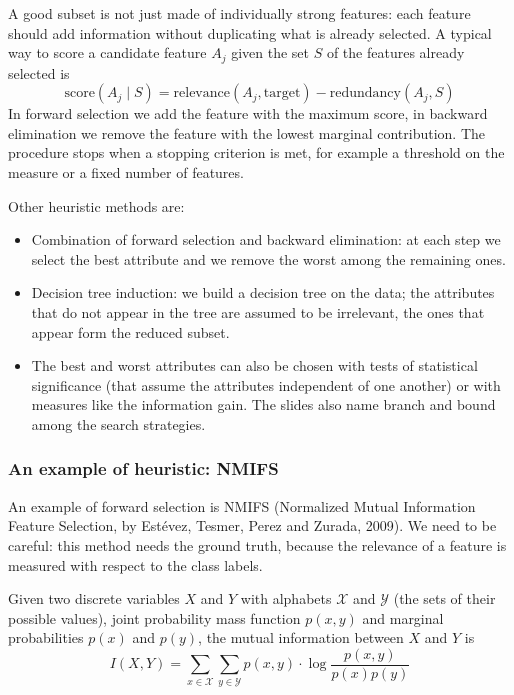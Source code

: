 A good subset is not just made of individually strong features: each feature should add information without duplicating what is already selected. A typical way to score a candidate feature $A_j$ given the set $S$ of the features already selected is
\[
    \text{score}(A_j \mid S) = \text{relevance}(A_j, \text{target}) - \text{redundancy}(A_j, S)
\]
In forward selection we add the feature with the maximum score, in backward elimination we remove the feature with the lowest marginal contribution. The procedure stops when a stopping criterion is met, for example a threshold on the measure or a fixed number of features.

Other heuristic methods are:
\begin{itemize}
    \item Combination of forward selection and backward elimination: at each step we select the best attribute and we remove the worst among the remaining ones.
    \item Decision tree induction: we build a decision tree on the data; the attributes that do not appear in the tree are assumed to be irrelevant, the ones that appear form the reduced subset.
    \item The best and worst attributes can also be chosen with tests of statistical significance (that assume the attributes independent of one another) or with measures like the information gain. The slides also name branch and bound among the search strategies.
\end{itemize}

\subsubsection{An example of heuristic: NMIFS}
An example of forward selection is NMIFS (Normalized Mutual Information Feature Selection, by Est\'evez, Tesmer, Perez and Zurada, 2009). We need to be careful: this method needs the ground truth, because the relevance of a feature is measured with respect to the class labels.

\begin{definition}
Given two discrete variables $X$ and $Y$ with alphabets $\mathcal{X}$ and $\mathcal{Y}$ (the sets of their possible values), joint probability mass function $p(x,y)$ and marginal probabilities $p(x)$ and $p(y)$, the mutual information between $X$ and $Y$ is
\[
    I(X,Y) = \sum_{x\in\mathcal{X}}\sum_{y\in\mathcal{Y}} p(x,y)\cdot\log\frac{p(x,y)}{p(x)p(y)}
\]
\end{definition}

